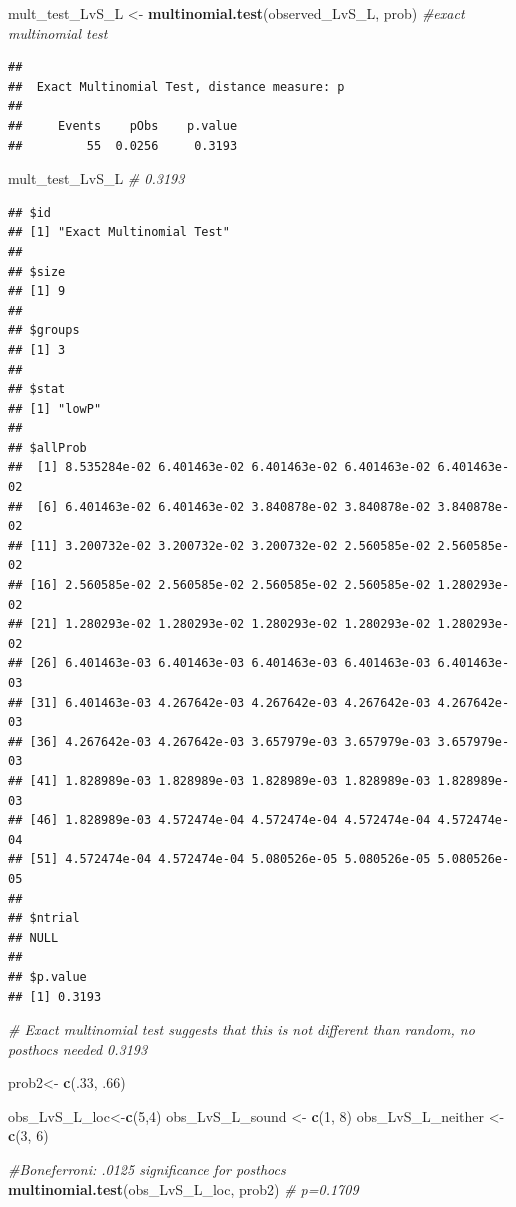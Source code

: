 \documentclass[]{article}
\newenvironment{Shaded}{\begin{snugshade}}{\end{snugshade}}
\newcommand{\KeywordTok}[1]{\textcolor[rgb]{0.13,0.29,0.53}{\textbf{{#1}}}}
\newcommand{\DecValTok}[1]{\textcolor[rgb]{0.00,0.00,0.81}{{#1}}}
\newcommand{\StringTok}[1]{\textcolor[rgb]{0.31,0.60,0.02}{{#1}}}
\newcommand{\CommentTok}[1]{\textcolor[rgb]{0.56,0.35,0.01}{\textit{{#1}}}}
\newcommand{\NormalTok}[1]{{#1}}
\begin{document}
\begin{Shaded}
\begin{Highlighting}[]
\NormalTok{mult_test_LvS_L <-}\StringTok{ }\KeywordTok{multinomial.test}\NormalTok{(observed_LvS_L, prob) }\CommentTok{#exact multinomial test}
\end{Highlighting}
\end{Shaded}

\begin{verbatim}
## 
##  Exact Multinomial Test, distance measure: p
## 
##     Events    pObs    p.value
##         55  0.0256     0.3193
\end{verbatim}

\begin{Shaded}
\begin{Highlighting}[]
\NormalTok{mult_test_LvS_L }\CommentTok{# 0.3193}
\end{Highlighting}
\end{Shaded}

\begin{verbatim}
## $id
## [1] "Exact Multinomial Test"
## 
## $size
## [1] 9
## 
## $groups
## [1] 3
## 
## $stat
## [1] "lowP"
## 
## $allProb
##  [1] 8.535284e-02 6.401463e-02 6.401463e-02 6.401463e-02 6.401463e-02
##  [6] 6.401463e-02 6.401463e-02 3.840878e-02 3.840878e-02 3.840878e-02
## [11] 3.200732e-02 3.200732e-02 3.200732e-02 2.560585e-02 2.560585e-02
## [16] 2.560585e-02 2.560585e-02 2.560585e-02 2.560585e-02 1.280293e-02
## [21] 1.280293e-02 1.280293e-02 1.280293e-02 1.280293e-02 1.280293e-02
## [26] 6.401463e-03 6.401463e-03 6.401463e-03 6.401463e-03 6.401463e-03
## [31] 6.401463e-03 4.267642e-03 4.267642e-03 4.267642e-03 4.267642e-03
## [36] 4.267642e-03 4.267642e-03 3.657979e-03 3.657979e-03 3.657979e-03
## [41] 1.828989e-03 1.828989e-03 1.828989e-03 1.828989e-03 1.828989e-03
## [46] 1.828989e-03 4.572474e-04 4.572474e-04 4.572474e-04 4.572474e-04
## [51] 4.572474e-04 4.572474e-04 5.080526e-05 5.080526e-05 5.080526e-05
## 
## $ntrial
## NULL
## 
## $p.value
## [1] 0.3193
\end{verbatim}

\begin{Shaded}
\begin{Highlighting}[]
\CommentTok{# Exact multinomial test suggests that this is not different than random, no posthocs needed  0.3193}



\NormalTok{prob2<-}\StringTok{ }\KeywordTok{c}\NormalTok{(.}\DecValTok{33}\NormalTok{, .}\DecValTok{66}\NormalTok{)}

\NormalTok{obs_LvS_L_loc<-}\KeywordTok{c}\NormalTok{(}\DecValTok{5}\NormalTok{,}\DecValTok{4}\NormalTok{)}
\NormalTok{obs_LvS_L_sound <-}\StringTok{ }\KeywordTok{c}\NormalTok{(}\DecValTok{1}\NormalTok{, }\DecValTok{8}\NormalTok{)}
\NormalTok{obs_LvS_L_neither <-}\StringTok{ }\KeywordTok{c}\NormalTok{(}\DecValTok{3}\NormalTok{, }\DecValTok{6}\NormalTok{)}

\CommentTok{#Boneferroni: .0125 significance for posthocs}
 \KeywordTok{multinomial.test}\NormalTok{(obs_LvS_L_loc, prob2) }\CommentTok{# p=0.1709}
\end{Highlighting}
\end{Shaded}
\end{document}
